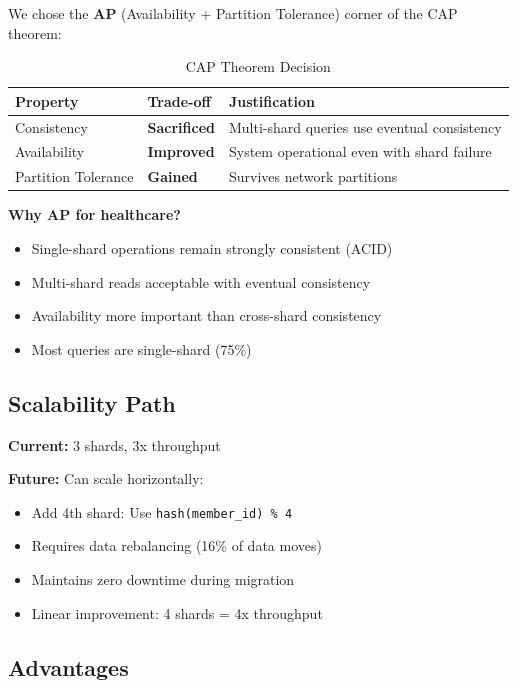 \documentclass[12pt,a4paper]{article}
\begin{document}
We chose the \textbf{AP} (Availability + Partition Tolerance) corner of the CAP theorem:

\begin{table}[H]
\centering
\begin{tabularx}{\textwidth}{|l|X|X|}
\hline
\textbf{Property} & \textbf{Trade-off} & \textbf{Justification} \\
\hline
Consistency & \textbf{Sacrificed} & Multi-shard queries use eventual consistency \\
Availability & \textbf{Improved} & System operational even with shard failure \\
Partition Tolerance & \textbf{Gained} & Survives network partitions \\
\hline
\end{tabularx}
\caption{CAP Theorem Decision}
\end{table}

\textbf{Why AP for healthcare?}
\begin{itemize}
    \item Single-shard operations remain strongly consistent (ACID)
    \item Multi-shard reads acceptable with eventual consistency
    \item Availability more important than cross-shard consistency
    \item Most queries are single-shard (75\%)
\end{itemize}

\subsection{Scalability Path}

\textbf{Current:} 3 shards, 3x throughput

\textbf{Future:} Can scale horizontally:
\begin{itemize}
    \item Add 4th shard: Use \texttt{hash(member\_id) \% 4}
    \item Requires data rebalancing (16\% of data moves)
    \item Maintains zero downtime during migration
    \item Linear improvement: 4 shards = 4x throughput
\end{itemize}

\subsection{Advantages}
\end{document}
